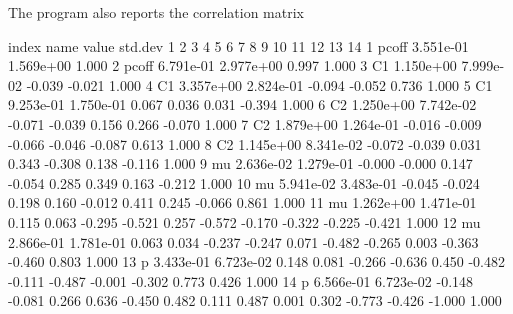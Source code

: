 The program also reports the correlation matrix
\begin{tinycode}

 index   name    value     std.dev     1     2      3      4      5      6      7      8      9     10     11     12     13     14 
     1   pcoff  3.551e-01 1.569e+00  1.000
    2   pcoff  6.791e-01 2.977e+00  0.997  1.000
    3   C1     1.150e+00 7.999e-02 -0.039 -0.021  1.000
    4   C1     3.357e+00 2.824e-01 -0.094 -0.052  0.736  1.000
    5   C1     9.253e-01 1.750e-01  0.067  0.036  0.031 -0.394  1.000
    6   C2     1.250e+00 7.742e-02 -0.071 -0.039  0.156  0.266 -0.070  1.000
    7   C2     1.879e+00 1.264e-01 -0.016 -0.009 -0.066 -0.046 -0.087  0.613  1.000
    8   C2     1.145e+00 8.341e-02 -0.072 -0.039  0.031  0.343 -0.308  0.138 -0.116  1.000
    9   mu     2.636e-02 1.279e-01 -0.000 -0.000  0.147 -0.054  0.285  0.349  0.163 -0.212  1.000
   10   mu     5.941e-02 3.483e-01 -0.045 -0.024  0.198  0.160 -0.012  0.411  0.245 -0.066  0.861  1.000
   11   mu     1.262e+00 1.471e-01  0.115  0.063 -0.295 -0.521  0.257 -0.572 -0.170 -0.322 -0.225 -0.421  1.000
   12   mu     2.866e-01 1.781e-01  0.063  0.034 -0.237 -0.247  0.071 -0.482 -0.265  0.003 -0.363 -0.460  0.803  1.000
   13   p      3.433e-01 6.723e-02  0.148  0.081 -0.266 -0.636  0.450 -0.482 -0.111 -0.487 -0.001 -0.302  0.773  0.426  1.000
   14   p      6.566e-01 6.723e-02 -0.148 -0.081  0.266  0.636 -0.450  0.482  0.111  0.487  0.001  0.302 -0.773 -0.426 -1.000  1.000
\end{tinycode}
